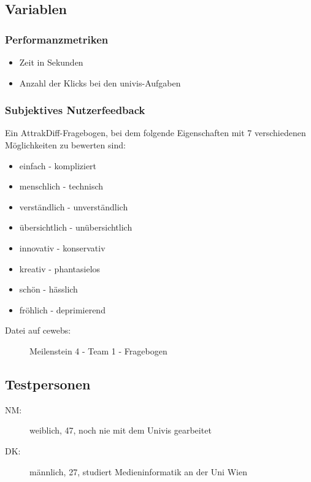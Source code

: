 \documentclass[a4paper,10pt]{scrartcl}
\begin{document}
\subsection{Variablen}

\subsubsection{Performanzmetriken}

\begin{itemize}
 \item Zeit in Sekunden
 \item Anzahl der Klicks bei den univis-Aufgaben
\end{itemize}

\subsubsection{Subjektives Nutzerfeedback}

Ein AttrakDiff-Fragebogen, bei dem folgende Eigenschaften mit 7 verschiedenen Möglichkeiten zu bewerten sind:

\begin{itemize}
\item einfach - kompliziert 
\item menschlich - technisch
\item verständlich - unverständlich
\item übersichtlich - unübersichtlich 
\item innovativ - konservativ
\item kreativ - phantasielos
\item schön - hässlich
\item fröhlich - deprimierend 
\end{itemize}

\begin{description}
 \item[Datei auf cewebs:]Meilenstein 4 - Team 1 - Fragebogen
\end{description}

\subsection{Testpersonen}

\begin{description}
 \item[NM:] weiblich, 47, noch nie mit dem Univis gearbeitet
 \item[DK:] männlich, 27, studiert Medieninformatik an der Uni Wien
\end{description}
\end{document}
